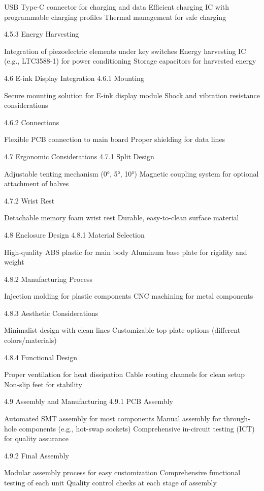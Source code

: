 \documentclass[a4paper,11pt]{article}%
\begin{document}
USB Type-C connector for charging and data
Efficient charging IC with programmable charging profiles
Thermal management for safe charging

4.5.3 Energy Harvesting

Integration of piezoelectric elements under key switches
Energy harvesting IC (e.g., LTC3588-1) for power conditioning
Storage capacitors for harvested energy

4.6 E-ink Display Integration
4.6.1 Mounting

Secure mounting solution for E-ink display module
Shock and vibration resistance considerations

4.6.2 Connections

Flexible PCB connection to main board
Proper shielding for data lines

4.7 Ergonomic Considerations
4.7.1 Split Design

Adjustable tenting mechanism (0°, 5°, 10°)
Magnetic coupling system for optional attachment of halves

4.7.2 Wrist Rest

Detachable memory foam wrist rest
Durable, easy-to-clean surface material

4.8 Enclosure Design
4.8.1 Material Selection

High-quality ABS plastic for main body
Aluminum base plate for rigidity and weight

4.8.2 Manufacturing Process

Injection molding for plastic components
CNC machining for metal components

4.8.3 Aesthetic Considerations

Minimalist design with clean lines
Customizable top plate options (different colors/materials)

4.8.4 Functional Design

Proper ventilation for heat dissipation
Cable routing channels for clean setup
Non-slip feet for stability

4.9 Assembly and Manufacturing
4.9.1 PCB Assembly

Automated SMT assembly for most components
Manual assembly for through-hole components (e.g., hot-swap sockets)
Comprehensive in-circuit testing (ICT) for quality assurance

4.9.2 Final Assembly

Modular assembly process for easy customization
Comprehensive functional testing of each unit
Quality control checks at each stage of assembly
\end{document}
